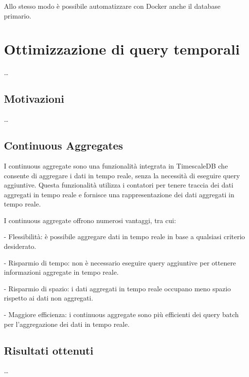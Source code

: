 Allo stesso modo è possibile automatizzare con Docker anche il database primario.

\section{Ottimizzazione di query temporali}\label{sec:cont-aggr}
\ldots

\subsection{Motivazioni}\label{ssec:cont-aggr-motivazioni}
\ldots

\subsection{Continuous Aggregates}\label{ssec:cont-aggr}
I continuous aggregate sono una funzionalità integrata in TimescaleDB che consente di aggregare i dati in tempo reale, senza la necessità di eseguire query aggiuntive. Questa funzionalità utilizza i contatori per tenere traccia dei dati aggregati in tempo reale e fornisce una rappresentazione dei dati aggregati in tempo reale.

I continuous aggregate offrono numerosi vantaggi, tra cui:

- Flessibilità: è possibile aggregare dati in tempo reale in base a qualsiasi criterio desiderato.

- Risparmio di tempo: non è necessario eseguire query aggiuntive per ottenere informazioni aggregate in tempo reale.

- Risparmio di spazio: i dati aggregati in tempo reale occupano meno spazio rispetto ai dati non aggregati.

- Maggiore efficienza: i continuous aggregate sono più efficienti dei query batch per l'aggregazione dei dati in tempo reale.

\subsection{Risultati ottenuti}\label{ssec:cont-aggr-risultati}
\ldots